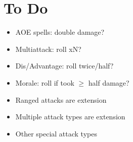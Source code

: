 \section{To Do}
\begin{itemize}
    \item AOE spells: double damage?
    \item Multiattack: roll xN?
    \item Dis/Advantage: roll twice/half?
    \item Morale: roll if took $\geq$ half damage?
    \item Ranged attacks are extension
    \item Multiple attack types are extension
    \item Other special attack types
\end{itemize}
